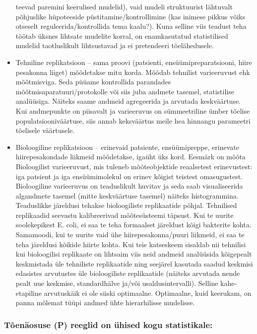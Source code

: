 \documentclass[]{book}
\begin{document}
\begin{itemize}
  teevad paremini keerulised mudelid), vaid mudeli struktuurist
  lähtuvalt põhjuslike hüpoteeside püstitamine/kontrollimine (kas
  inimese pikkus võiks otseselt reguleerida/kontrollida tema kaalu?).
  Kuna selline viis teadust teha töötab üksnes lihtsate mudelite korral,
  on enamkasutatud statistilised mudelid taotluslikult lihtsustavad ja
  ei pretendeeri tõelähedusele.
\item
  Tehniline replikatsioon -- sama proovi (patsienti,
  ensüümipreparatsiooni, hiire pesakonna liiget) mõõdetakse mitu korda.
  Mõõdab tehnilist varieeruvust ehk mõõtmisviga. Seda püüame kontrollida
  parandades mõõtmisaparatuuri/protokolle või siis juba andmete tasemel,
  statistilise analüüsiga. Näiteks saame andmeid agregeerida ja arvutada
  keskväärtuse. Kui andmepunkte on piisavalt ja varieeruvus on
  sümmeetriline ümber tõelise populatsiooniväärtuse, siis annab
  keksväärtus meile hea hinnangu parameetri tõelisele väärtusele.
\item
  Bioloogiline replikatsioon -- erinevaid patsiente, ensüümipreppe,
  erinevate hiirepesakondade liikmeid mõõdetakse, igaüht üks kord.
  Eesmärk on mõõta Bioloogilist varieeruvust, mis tuleneb mõõteobjektide
  reaalsetest erinevustest: iga patsient ja iga ensüümimolekul on erinev
  kõigist teistest omasugustest. Bioloogiline varieeruvus on
  teaduslikult huvitav ja seda saab visualiseerida algandmete tasemel
  (mitte keskväärtuse tasemel) näiteks histogrammina. Teaduslikke
  järeldusi tehakse bioloogiliste replikaatide põhjal. Tehnilised
  replikaadid seevastu kalibreerivad mõõtesüsteemi täpsust. Kui te
  uurite soolekepikest E. coli, ei saa te teha formaalset järeldust
  kõigi bakterite kohta. Samamoodi, kui te uurite vaid ühe
  hiirepesakonna/puuri liikmeid, ei saa te teha järeldusi kõikide hiirte
  kohta. Kui teie katseskeem sisaldab nii tehnilisi kui bioloogilisi
  replikaate on lihtsaim viis neid andmeid analüüsida kõigepealt
  keskmistada üle tehniliste replikaatide ning seejärel kasutada saadud
  keskmisi edasistes arvutustes üle bioloogiliste replikaatide (näiteks
  arvutada nende pealt uue keskmise, standardhälve ja/või
  usaldusintervalli). Selline kahe-etapiline arvutuskäik ei ole siiski
  optimaalne. Optimaalne, kuid keerukam, on panna mõlemat tüüpi andmed
  ühte hierarhilisse mudelisse.
\end{itemize}

\subsubsection{Tõenäosuse (P) reeglid on ühised kogu
statistikale:}\label{toenaosuse-p-reeglid-on-uhised-kogu-statistikale}
\end{document}
